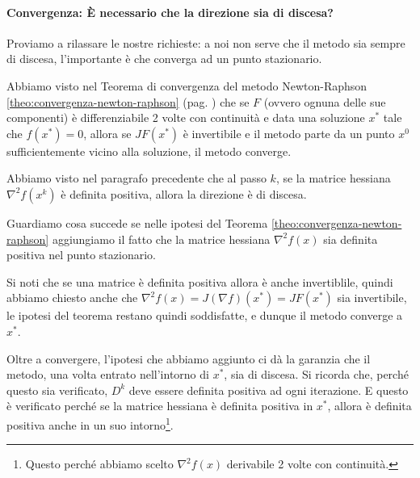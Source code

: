 \paragraph{Convergenza: \`E necessario che la direzione sia di discesa?}
Proviamo a rilassare le nostre richieste: a noi non serve che il
metodo sia sempre di discesa, l'importante \`e che converga ad un punto
stazionario.

Abbiamo visto nel Teorema di convergenza del metodo Newton-Raphson
\ref{theo:convergenza-newton-raphson} (pag. \pageref{theo:convergenza-newton-raphson}) che se $F$ (ovvero ognuna delle
sue componenti) \`e differenziabile 2 volte con continuit\`a e data una
soluzione $x^*$ tale che $f(x^*) =0$, allora se $JF(x^{*})$
\`e invertibile e il metodo parte da un punto $x^0$
sufficientemente vicino alla soluzione, il metodo converge.


Abbiamo visto nel paragrafo precedente che al passo $k$, se la matrice hessiana $\nabla^2 f(x^k)$ \`e
definita positiva, allora la direzione \`e di discesa.

Guardiamo cosa succede se nelle
ipotesi del Teorema \ref{theo:convergenza-newton-raphson} aggiungiamo il fatto che la
matrice hessiana $\nabla^2f(x)$ sia definita positiva nel punto
stazionario.

Si noti che se una matrice \`e definita positiva allora \`e anche
invertiblile, quindi abbiamo chiesto anche che $\nabla^2f(x) =
J(\nabla f)(x^{*}) = JF(x^{*})$ sia invertibile, le ipotesi del
teorema restano quindi soddisfatte, e dunque il metodo converge a $x^*$.

Oltre a convergere, l'ipotesi che abbiamo aggiunto ci dà la garanzia che il metodo, una volta entrato nell'intorno di $x^*$, sia di discesa. Si ricorda che, perché questo sia verificato, $D^k$ deve essere definita positiva ad ogni iterazione. E questo è verificato perché se la matrice hessiana \`e definita positiva in $x^*$,
allora \`e definita positiva anche in un suo intorno\footnote{Questo
perch\'e abbiamo scelto $\nabla^2 f(x)$ derivabile 2 volte con continuità.}.



